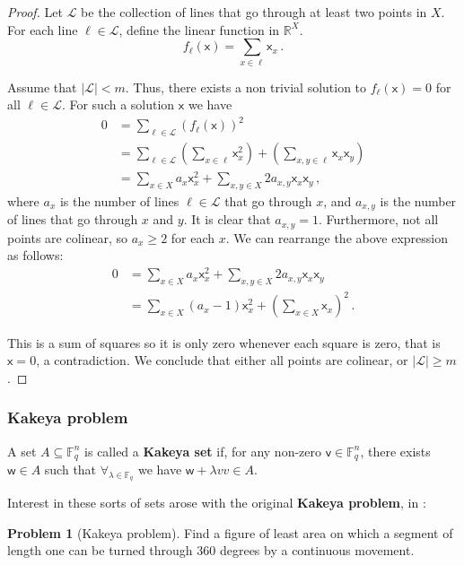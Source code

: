 \documentclass[12pt]{amsart}
\theoremstyle{definition}
\newtheorem{prob}[thm]{Problem}
\newcommand{\R}{\mathbb{R}}
\newcommand{\F}{\mathbb{F}}
\newcommand{\vv}{\mathsf{v}}
\newcommand{\vw}{\mathsf{w}}
\newcommand{\vx}{\mathsf{x}}
\begin{document}
\begin{proof}
Let $\mathcal L$ be the collection of lines that go through at least two points in $X$.
For each line $\ell \in \mathcal L$, define the linear function in $\R^X$.
$$ f_{\ell}(\vx) = \sum_{x\in \ell} \vx_x \, .$$

Assume that $|\mathcal L | < m$.
Thus, there exists a non trivial solution to $f_{\ell}(\vx) = 0 $ for all $\ell \in \mathcal L$.
For such a solution $\vx$ we have
\begin{align*}
0 &= \sum_{\ell \in \mathcal L} \left( f_{\ell}(\vx) \right)^2 \\
&= \sum_{\ell \in \mathcal L} \left(\sum_{x \in \ell}\vx_x^2 \right) + \left( \sum_{x, y \in \ell} \vx_x \vx_y \right)\\
&= \sum_{x \in X} a_x\vx_x^2 + \sum_{x, y \in X}2 a_{x, y} \vx_x \vx_y  \, ,
\end{align*}
where $a_x$ is the number of lines $\ell \in \mathcal L$ that go through $x$, and $a_{x, y}$ is the number of lines that go through $x$ and $ y$.
It is clear that $a_{x, y} = 1$.
Furthermore, not all points are colinear, so $a_x\geq 2$ for each $x$.
We can rearrange the above expression as follows:
\begin{align*}
0 &=  \sum_{x \in X} a_x\vx_x^2 + \sum_{x, y \in X}2 a_{x, y} \vx_x \vx_y\\
&=  \sum_{x \in X} (a_x-  1) \vx_x^2 + \left(\sum_{x \in X}\vx_x \right)^2  \, .
\end{align*}

This is a sum of squares so it is only zero whenever each square is zero, that is $\vx = 0$, a contradiction.
We conclude that either all points are colinear, or $|\mathcal L | \geq m$.
\end{proof}

\subsubsection*{Kakeya problem}


A set $A \subseteq \F_q^n$ is called a \textbf{Kakeya set} if, for any non-zero $\vv\in\F_q^n$, there exists $\vw \in A$ such that $\forall_{\lambda \in \F_q}$ we have  $\vw + \lambda vv \in A$.

Interest in these sorts of sets arose with the original \textbf{Kakeya problem}, in \cite{fujiwara1917some}:

\begin{prob}[Kakeya problem]
Find a figure of least area on which a segment of length one can be turned through 360 degrees by a continuous movement.
\end{prob}
\end{document}
